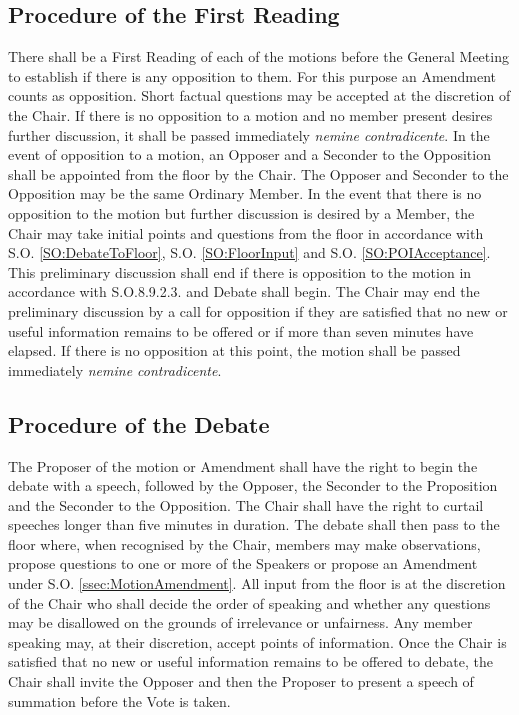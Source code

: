 \subsection{Procedure of the First Reading}
\npara There shall be a First Reading of each of the motions before the General Meeting to establish if there is any opposition to them. For this purpose an Amendment counts as opposition. Short factual questions may be accepted at the discretion of the Chair.
\npara If there is no opposition to a motion and no member present desires further discussion, it shall be passed immediately \textit{nemine contradicente}.
\npara \label{SO:Opposition} In the event of opposition to a motion, an Opposer and a Seconder to the Opposition shall be appointed from the floor by the Chair.  The Opposer and Seconder to the Opposition may be the same Ordinary Member.
\npara In the event that there is no opposition to the motion but further discussion is desired by a Member, the Chair may take initial points and questions from the floor in accordance with S.O. \ref{SO:DebateToFloor}, S.O. \ref{SO:FloorInput} and S.O. \ref{SO:POIAcceptance}.
\npara This preliminary discussion shall end if there is opposition to the motion in accordance with S.O.8.9.2.3. and Debate shall begin.  
\npara The Chair may end the preliminary discussion by a call for opposition if they are satisfied that no new or useful information remains to be offered or if more than seven minutes have elapsed. If there is no opposition at this point, the motion shall be passed immediately \textit{nemine contradicente}.
\subsection{Procedure of the Debate} \label{ssec:DebateProcedure}
\npara The Proposer of the motion or Amendment shall have the right to begin the debate with a speech, followed by the Opposer, the Seconder to the Proposition and the Seconder to the Opposition. The Chair shall have the right to curtail speeches longer than five minutes in duration.
\npara \label{SO:DebateToFloor} The debate shall then pass to the floor where, when recognised by the Chair, members may make observations, propose questions to one or more of the Speakers or propose an Amendment under S.O. \ref{ssec:MotionAmendment}.
\npara \label{SO:FloorInput} All input from the floor is at the discretion of the Chair who shall decide the order of speaking and whether any questions may be disallowed on the grounds of irrelevance or unfairness.
\npara \label{SO:POIAcceptance} Any member speaking may, at their discretion, accept points of information.
\npara Once the Chair is satisfied that no new or useful information remains to be offered to debate, the Chair shall invite the Opposer and then the Proposer to present a speech of summation before the Vote is taken.
